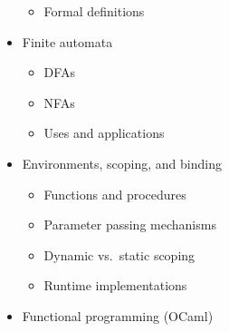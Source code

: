 \documentclass[10pt]{article}
\begin{document}
\begin{multicols}{2}
\begin{itemize}
\begin{itemize}
                \item Formal definitions

              \end{itemize}

              \vspace{-2mm}

        \item Finite automata

              \vspace{-2.5mm}

              \begin{itemize}

                \addtolength{\itemsep}{-.5mm}

                \item DFAs

                \item NFAs

                \item Uses and applications

              \end{itemize}

              \vspace{-2mm}

        \item Environments, scoping, and binding

              \vspace{-2.5mm}

              \begin{itemize}

                \addtolength{\itemsep}{-.5mm}

                \item Functions and procedures

                \item Parameter passing mechanisms

                \item Dynamic vs.\ static scoping

                \item Runtime implementations

              \end{itemize}

              \vspace{-2mm}

        \item Functional programming (OCaml)


\end{itemize}
\end{multicols}
\end{document}
